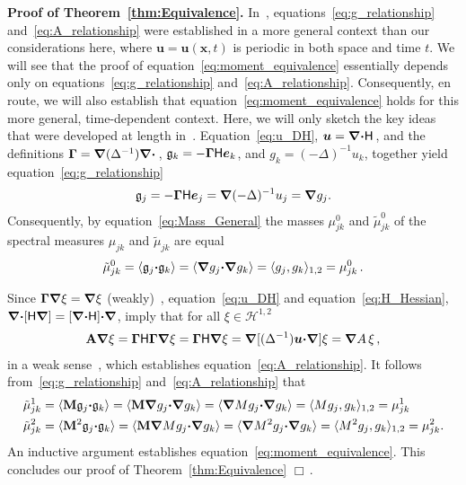 \documentclass[english,12pt,jmp,graphicx]{revtex4-1}
\newcommand{\vecu}{\boldsymbol{u}}
\newcommand{\vecx}{\boldsymbol{x}}
\newcommand{\vecg}{\mathfrak{g}}
\newcommand{\vece}{\boldsymbol{e}}
\newcommand{\thmref}[1]{Theorem~\ref{#1}}
\newcommand{\bnabla}{\mbox{\boldmath${\nabla}$}}
\newcommand{\bGamma}{\mbox{\boldmath${\Gamma}$}}
\newcommand{\bcdot}{\mbox{\boldmath${\cdot}$}}
\newcommand{\Hs}{\mathscr{H}}
\newcommand{\Hm}{\mathsf{H}}
\newcommand{\Mb}{\mathbf{M}}
\newcommand{\Ab}{\mathbf{A}}
\begin{document}
\noindent
\textbf{Proof of \thmref{thm:Equivalence}.}
In~\cite{Murphy:ADSTPF-2017}, equations~\eqref{eq:g_relationship} 
and~\eqref{eq:A_relationship} were established in a more general 
context than our considerations here, where $\vecu=\vecu(\vecx,t)$ 
is periodic in both space and time $t$. We will see that the proof 
of equation~\eqref{eq:moment_equivalence} essentially depends only 
on equations~\eqref{eq:g_relationship} 
and~\eqref{eq:A_relationship}. Consequently, en route, we will also
establish that equation~\eqref{eq:moment_equivalence} holds for this 
more general, time-dependent context.
Here, we will only sketch the key ideas that were developed at 
length in~\cite{Murphy:ADSTPF-2017}.
Equation~\eqref{eq:u_DH}, $\vecu=\bnabla\bcdot\Hm\,$, and the definitions 
$\bGamma=\bnabla(\Delta^{-1})\bnabla\bcdot\,$, 
$\vecg_k=-\bGamma\Hm\vece_k$, and $g_k=(-\Delta)^{-1}u_k$, together 
yield~\cite{Murphy:ADSTPF-2017} equation~\eqref{eq:g_relationship}
%
\begin{align}\label{eq:vecg_g}
  \vecg_j=-\bGamma\Hm\vece_j=\bnabla(-\Delta)^{-1}u_j=\bnabla g_j.
\end{align}
%
Consequently, by equation~\eqref{eq:Mass_General} the masses 
$\mu_{jk}^0$ and $\tilde{\mu}_{jk}^0$ of the spectral measures 
$\mu_{jk}$ and $\tilde{\mu}_{jk}$ are equal
%
\begin{align}
\tilde{\mu}_{jk}^0 = \langle \vecg_j\bcdot\vecg_k\rangle
                   = \langle \bnabla g_j\bcdot\bnabla g_k\rangle
                   = \langle g_j,g_k\rangle_{1,2}
                   = \mu_{jk}^0\,.
\end{align}




Since $\bGamma\bnabla\xi=\bnabla\xi$ (weakly)~\cite{Murphy:ADSTPF-2017},  
equation~\eqref{eq:u_DH} and equation~\eqref{eq:H_Hessian}, 
$\bnabla\bcdot[\Hm\bnabla]=[\bnabla\bcdot\Hm]\bcdot\bnabla$, imply 
that for all $\xi\in\Hs^{1,2}$
%
\begin{align}
\Ab\bnabla\xi = \bGamma\Hm\bGamma\bnabla\xi
              = \bGamma\Hm\bnabla\xi
              = \bnabla[(\Delta^{-1})\vecu\bcdot\bnabla]\xi 
              = \bnabla A\,\xi\,,
\end{align}
%
in a weak sense~\cite{Murphy:ADSTPF-2017}, which establishes 
equation~\eqref{eq:A_relationship}. It follows 
from~\eqref{eq:g_relationship} and~\eqref{eq:A_relationship} that
%
\begin{align}
\tilde{\mu}_{jk}^1 
&= \langle\Mb\vecg_j\bcdot\vecg_k\rangle
= \langle\Mb\bnabla g_j\bcdot\bnabla g_k\rangle
= \langle \bnabla M g_j\bcdot\bnabla g_k\rangle
= \langle M g_j,g_k\rangle_{1,2}
= \mu_{jk}^1
\\
\tilde{\mu}_{jk}^2 
&= \langle\Mb^2\vecg_j\bcdot\vecg_k\rangle
= \langle\Mb\bnabla M g_j\bcdot\bnabla g_k\rangle
= \langle \bnabla M^2 g_j\bcdot\bnabla g_k\rangle
= \langle M^2 g_j,g_k\rangle_{1,2}
= \mu_{jk}^2.
\notag
\end{align}
%
An inductive argument establishes equation~\eqref{eq:moment_equivalence}.
This concludes our proof of \thmref{thm:Equivalence} $\Box\,.$
\end{document}
